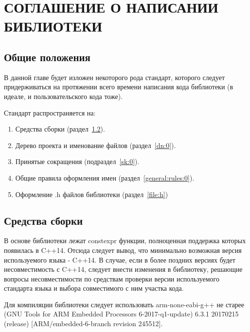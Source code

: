 \chapter{СОГЛАШЕНИЕ О НАПИСАНИИ БИБЛИОТЕКИ}
\section{Общие положения}
В данной главе будет изложен некоторого рода стандарт, которого следует придерживаться на протяжении всего времени написания кода библиотеки (в идеале, и пользовательского кода тоже).

Стандарт распространяется на:
\begin{enumerate}
	\item Средства сборки (раздел~\ref{compgcc:0}).
	\item Дерево проекта и именование файлов (раздел~\ref{dn:0}).
	\item Принятые сокращения (подраздел~\ref{sk:0}).
	\item Общие правила оформления имен (раздел~\ref{general:rules:0}).
	\item Оформление .h файлов библиотеки (раздел~\ref{file:h})
\end{enumerate}

\section{Средства сборки}
\label{compgcc:0}
В основе библиотеки лежат constexpr функции, полноценная поддержка которых появилась в C++14. Отсюда следует вывод, что минимально возможная версия используемого языка - C++14. В случае, если в более поздних версиях будет несовместимость с C++14, следует внести изменения в библиотеку, решающие вопросы несовместимости по средствам проверки версии используемого стандарта языка и выбора совместимого с ним участка кода.

Для компиляции библиотеки следует использовать arm-none-eabi-g++ не старее (GNU Tools for ARM Embedded Processors 6-2017-q1-update) 6.3.1 20170215 (release) [ARM/embedded-6-branch revision 245512].

